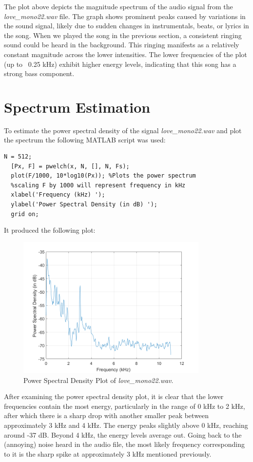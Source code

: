 \documentclass[a4paper, 10pt]{article}
\begin{document}
\noindent The plot above depicts the magnitude spectrum of the audio signal from the \textit{love\_mono22.wav} file.
The graph shows prominent peaks caused by variations in the sound signal, likely due to sudden changes
in instrumentals, beats, or lyrics in the song. When we played the song in the previous section, a
consistent ringing sound could be heard in the background. This ringing manifests as a relatively constant
magnitude across the lower intensities. The lower frequencies of the plot (up to ~0.25 kHz) exhibit higher
energy levels, indicating that this song has a strong bass component.

\section{Spectrum Estimation}
To estimate the power spectral density of the signal \textit{love\_mono22.wav} and plot the spectrum
the following MATLAB script was used:
\begin{lstlisting}[style=Matlab-editor, basicstyle=\small\ttfamily]
  N = 512;
  [Px, F] = pwelch(x, N, [], N, Fs);
  plot(F/1000, 10*log10(Px)); %Plots the power spectrum
  %scaling F by 1000 will represent frequency in kHz
  xlabel('Frequency (kHz) ');
  ylabel('Power Spectral Density (in dB) ');
  grid on;
\end{lstlisting}
It produced the following plot:
\begin{figure}[H]
  \centering
  \includegraphics[width=9.5cm]{images/q3a.png}
  \caption{Power Spectral Density Plot of \textit{love\_mono22.wav}.}
\end{figure}
\noindent After examining the power spectral density plot, it is clear that the lower frequencies contain the most 
energy, particularly in the range of 0 kHz to 2 kHz, after which there is a sharp drop with another smaller peak 
between approximately 3 kHz and 4 kHz. The energy peaks slightly above 0 kHz, reaching around -37 dB. Beyond 4 kHz,
the energy levels average out. Going back to the (annoying) noise heard in the audio file, the most likely frequency 
corresponding to it is the sharp spike at approximately 3 kHz mentioned previously.
\end{document}
